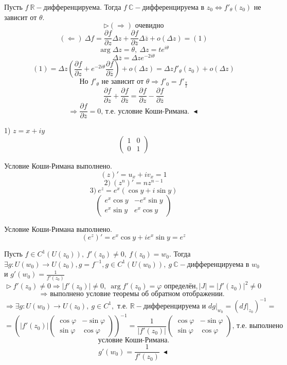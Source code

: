  Пусть $f \ \mathbb{R}-$дифференцируема. Тогда $f \ \mathbb{C}-$дифференцируема в $z_0 \Leftrightarrow f'_\theta(z_0)$ не зависит от $\theta$.
\[\triangleright (\Rightarrow) \text{ очевидно}\]
\[(\Leftarrow) \ \Delta f = \frac{\partial f}{\partial z}\Delta z +\frac{\partial f}{\partial \overline{z}}\Delta \overline{z}+o(\Delta z) = (1)\]
\[\arg \Delta z = \theta, \ \Delta z = te^{i\theta}\]
\[\Delta \overline{z} = \Delta z e^{-2i\theta}\]
\[(1) = \Delta z \left(\frac{\partial f}{\partial z} + e^{-2i\theta} \frac{\partial f}{\partial \overline{z}}\right)+o(\Delta z)=\Delta z f'_\theta (z_0) +o(\Delta z)\]
\[\text{Но $f'_\theta$ не зависит от $\theta \Rightarrow f'_0=f'_\frac{\pi}{2}$}\]
\[\frac{\partial f}{\partial z} + \frac{\partial f}{\partial \overline{z}}=\frac{\partial f}{\partial z} -\frac{\partial f}{\partial \overline{z}}\]
\[\Rightarrow \frac{\partial f}{\partial \overline{z}} = 0 \text{, т.е. условие Коши-Римана. } \blacktriangleleft\]

 1) $z=x+iy$
\[\left(\begin{array}{ll}
1 & 0 \\
0 & 1    
\end{array}\right)\]

Условие Коши-Римана выполнено.
\[(z)'=u_x+iv_x=1\]
\[2) \ (z^n)'=nz^{n-1}\]
\[3) \ e^z = e^x(\cos y + i\sin y)\]
\[\left(\begin{array}{ll}
e^x\cos y & -e^x \sin y \\
e^x \sin y & e^x \cos y    
\end{array}\right)\]

Условие Коши-Римана выполнено.
\[(e^z)' = e^x \cos y + ie^x \sin y =e^z\]

 Пусть $f \in C^1 (U(z_0)), \ f'(z_0) \neq 0, \ f(z_0) = w_0$. Тогда $\exists g: U(w_0)\to U(z_0), g=f^{-1}, g \in C^1(U(w_0)), \ g \ \mathbb{C}-$дифференцируема в $w_0$ и $g'(w_0)=\frac{1}{f'(z_0)}$
\[\triangleright \ f'(z_0) \neq 0 \Rightarrow |f'(z_0)|\neq 0, \ \arg f'(z_0) = \varphi \text{ определён} ,|J| = |f'(z_0)|^2 \neq 0\]
\[\Rightarrow \text{ выполнено условие теоремы об обратном отображении. }\]
\[\Rightarrow \exists g : U(w_0)\to U(z_0), \ g \in C^1, \text{ т.е. } \mathbb{R}-\text{дифференцируема и }dg|_{w_0} = (df|_{z_0})^{-1} =\] 
\[= \left(|f'(z_0)| \left(\begin{array}{ll}
\cos \varphi & -\sin \varphi \\
\sin \varphi & \cos \varphi   
\end{array}\right)\right)^{-1} = \frac{1}{|f'(z_0)|} \left(\begin{array}{ll}
\cos \varphi & -\sin \varphi \\
\sin \varphi & \cos \varphi   
\end{array}\right) \text{, т.е. выполнено}\]
\[\text{условие Коши-Римана.}\]
\[g'(w_0) = \frac{1}{f'(z_0)} \ \blacktriangleleft\]

